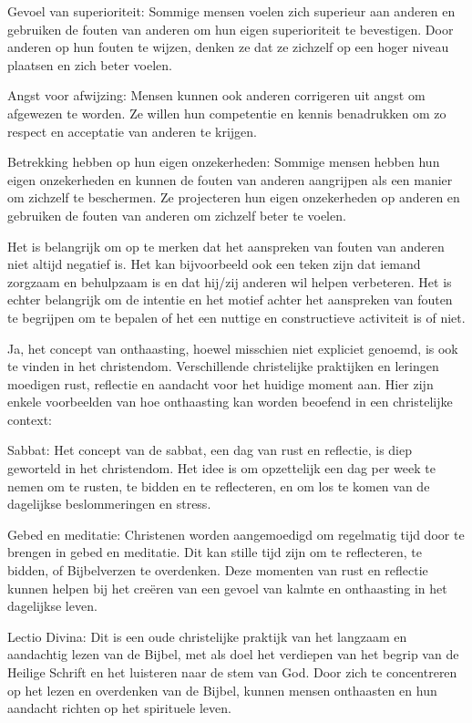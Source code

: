 Gevoel van superioriteit: Sommige mensen voelen zich superieur aan anderen en gebruiken de fouten van anderen om hun eigen superioriteit te bevestigen. Door anderen op hun fouten te wijzen, denken ze dat ze zichzelf op een hoger niveau plaatsen en zich beter voelen.

Angst voor afwijzing: Mensen kunnen ook anderen corrigeren uit angst om afgewezen te worden. Ze willen hun competentie en kennis benadrukken om zo respect en acceptatie van anderen te krijgen.

Betrekking hebben op hun eigen onzekerheden: Sommige mensen hebben hun eigen onzekerheden en kunnen de fouten van anderen aangrijpen als een manier om zichzelf te beschermen. Ze projecteren hun eigen onzekerheden op anderen en gebruiken de fouten van anderen om zichzelf beter te voelen.

Het is belangrijk om op te merken dat het aanspreken van fouten van anderen niet altijd negatief is. Het kan bijvoorbeeld ook een teken zijn dat iemand zorgzaam en behulpzaam is en dat hij/zij anderen wil helpen verbeteren. Het is echter belangrijk om de intentie en het motief achter het aanspreken van fouten te begrijpen om te bepalen of het een nuttige en constructieve activiteit is of niet.

Ja, het concept van onthaasting, hoewel misschien niet expliciet genoemd, is ook te vinden in het christendom. Verschillende christelijke praktijken en leringen moedigen rust, reflectie en aandacht voor het huidige moment aan. Hier zijn enkele voorbeelden van hoe onthaasting kan worden beoefend in een christelijke context:

Sabbat: Het concept van de sabbat, een dag van rust en reflectie, is diep geworteld in het christendom. Het idee is om opzettelijk een dag per week te nemen om te rusten, te bidden en te reflecteren, en om los te komen van de dagelijkse beslommeringen en stress.

Gebed en meditatie: Christenen worden aangemoedigd om regelmatig tijd door te brengen in gebed en meditatie. Dit kan stille tijd zijn om te reflecteren, te bidden, of Bijbelverzen te overdenken. Deze momenten van rust en reflectie kunnen helpen bij het creëren van een gevoel van kalmte en onthaasting in het dagelijkse leven.

Lectio Divina: Dit is een oude christelijke praktijk van het langzaam en aandachtig lezen van de Bijbel, met als doel het verdiepen van het begrip van de Heilige Schrift en het luisteren naar de stem van God. Door zich te concentreren op het lezen en overdenken van de Bijbel, kunnen mensen onthaasten en hun aandacht richten op het spirituele leven.

